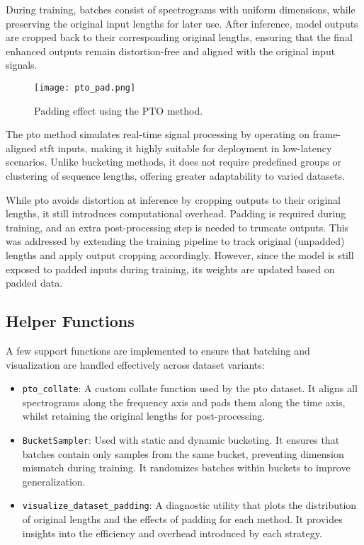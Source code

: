 During training, batches consist of spectrograms with uniform dimensions, while preserving the original input lengths for later use. After inference, model outputs are cropped back to their corresponding original lengths, ensuring that the final enhanced outputs remain distortion-free and aligned with the original input signals.

\begin{figure}[H]
    \centering
    \texttt{[image: pto\_pad.png]}
    \caption{Padding effect using the PTO method.}
    \label{fig:pto_pad}
\end{figure}

The \gls{pto} method simulates real-time signal processing by operating on frame-aligned \gls{stft} inputs, making it highly suitable for deployment in low-latency scenarios. Unlike bucketing methods, it does not require predefined groups or clustering of sequence lengths, offering greater adaptability to varied datasets.

While \gls{pto} avoids distortion at inference by cropping outputs to their original lengths, it still introduces computational overhead. Padding is required during training, and an extra post-processing step is needed to truncate outputs. This was addressed by extending the training pipeline to track original (unpadded) lengths and apply output cropping accordingly. However, since the model is still exposed to padded inputs during training, its weights are updated based on padded data.

\subsection{Helper Functions}
\label{subsec:helper_functions}

A few support functions are implemented to ensure that batching and visualization are handled effectively across dataset variants:

\begin{itemize}
    \item \texttt{pto\_collate}: A custom collate function used by the \gls{pto} dataset. It aligns all spectrograms along the frequency axis and pads them along the time axis, whilst retaining the original lengths for post-processing.
    \item \texttt{BucketSampler}: Used with static and dynamic bucketing. It ensures that batches contain only samples from the same bucket, preventing dimension mismatch during training. It randomizes batches within buckets to improve generalization.
    \item \texttt{visualize\_dataset\_padding}: A diagnostic utility that plots the distribution of original lengths and the effects of padding for each method. It provides insights into the efficiency and overhead introduced by each strategy.
\end{itemize}


